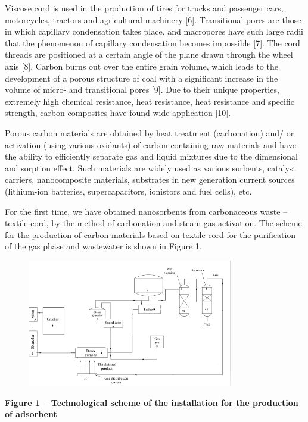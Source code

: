 Viscose cord is used in the production of tires for trucks and passenger
cars, motorcycles, tractors and agricultural machinery {[}6{]}.
Transitional pores are those in which capillary condensation takes
place, and macropores have such large radii that the phenomenon of
capillary condensation becomes impossible {[}7{]}. The cord threads are
positioned at a certain angle of the plane drawn through the wheel axis
{[}8{]}. Carbon burns out over the entire grain volume, which leads to
the development of a porous structure of coal with a significant
increase in the volume of micro- and transitional pores {[}9{]}. Due to
their unique properties, extremely high chemical resistance, heat
resistance, heat resistance and specific strength, carbon composites
have found wide application {[}10{]}.

Porous carbon materials are obtained by heat treatment (carbonation)
and/ or activation (using various oxidants) of carbon-containing raw
materials and have the ability to efficiently separate gas and liquid
mixtures due to the dimensional and sorption effect. Such materials are
widely used as various sorbents, catalyst carriers, nanocomposite
materials, substrates in new generation current sources (lithium-ion
batteries, supercapacitors, ionistors and fuel cells), etc.

For the first time, we have obtained nanosorbents from carbonaceous
waste -- textile cord, by the method of carbonation and steam-gas
activation. The scheme for the production of carbon materials based on
textile cord for the purification of the gas phase and wastewater is
shown in Figure 1.

\begin{figure}[H]
	\centering
	\includegraphics[width=0.8\textwidth]{assets/1004}
	\caption*{}
\end{figure}

\textbf{Figure 1 -- Technological scheme of the installation for the
production of adsorbent}

